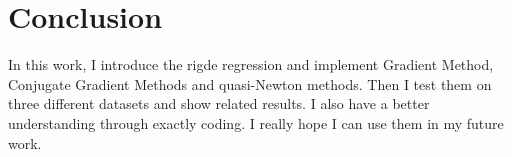 \section{Conclusion}
In this work, I introduce the rigde regression and implement Gradient Method, Conjugate Gradient Methods and
quasi-Newton methods. Then I test them on three different datasets and show related results. I also have a better
understanding through exactly coding. I really hope I can use them in my future work.